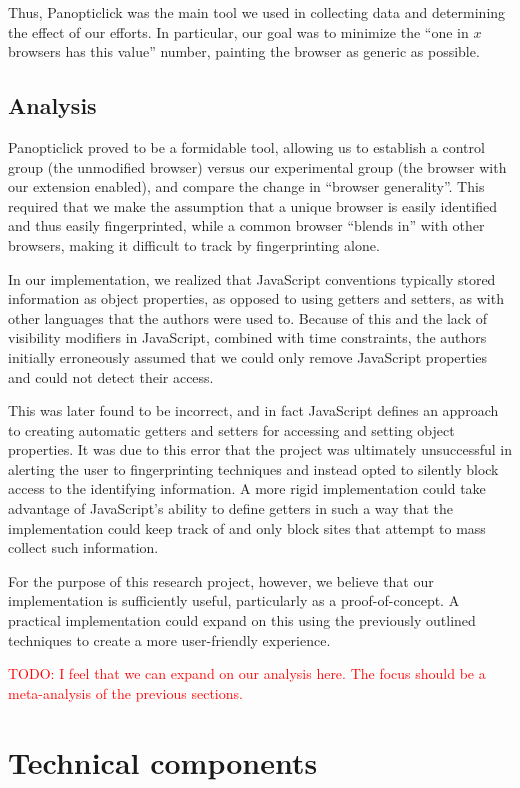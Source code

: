 \documentclass[12pt,a4paper]{article}
\begin{document}
Thus, Panopticlick was the main tool we used in collecting data and determining the effect of our efforts. In particular, our goal was to minimize the ``one in $x$ browsers has this value'' number, painting the browser as generic as possible.

\subsection{Analysis}
Panopticlick proved to be a formidable tool, allowing us to establish a control group (the unmodified browser) versus our experimental group (the browser with our extension enabled), and compare the change in ``browser generality''. This required that we make the assumption that a unique browser is easily identified and thus easily fingerprinted, while a common browser ``blends in'' with other browsers, making it difficult to track by fingerprinting alone.

In our implementation, we realized that JavaScript conventions typically stored information as object properties, as opposed to using getters and setters, as with other languages that the authors were used to. Because of this and the lack of visibility modifiers in JavaScript, combined with time constraints, the authors initially erroneously assumed that we could only remove JavaScript properties and could not detect their access.

This was later found to be incorrect, and in fact JavaScript defines an approach to creating automatic getters and setters for accessing and setting object properties. It was due to this error that the project was ultimately unsuccessful in alerting the user to fingerprinting techniques and instead opted to silently block access to the identifying information. A more rigid implementation could take advantage of JavaScript's ability to define getters in such a way that the implementation could keep track of and only block sites that attempt to mass collect such information.

For the purpose of this research project, however, we believe that our implementation is sufficiently useful, particularly as a proof-of-concept. A practical implementation could expand on this using the previously outlined techniques to create a more user-friendly experience.

\textcolor{red}{TODO: I feel that we can expand on our analysis here. The focus should be a meta-analysis of the previous sections.}

\section{Technical components}
\end{document}
